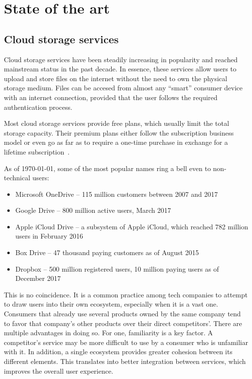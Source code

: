 \chapter{State of the art}\label{state_of_the_art}

\section{Cloud storage services} \label{cloud_storage_services}

Cloud storage services have been steadily increasing in popularity and reached mainstream status in the past decade. In essence, these services allow users to upload and store files on the internet without the need to own the physical storage medium. Files can be accesed from almost any ``smart'' consumer device with an internet connection, provided that the user follows the required authentication process.

Most cloud storage services provide free plans, which usually limit the total storage capacity. Their premium plans either follow the subscription business model or even go as far as to require a one-time purchase in exchange for a lifetime subscription~\cite{get_3tb_of_lifetime_cloud_storage}.

As of \monthyeardate\today, some of the most popular names ring a bell even to non-technical users:
\begin{itemize} \label{lst:cloud_storage_services}
\itemsep0em
\item Microsoft OneDrive -- 115 million customers between 2007 and 2017~\cite{10_years_of_onedrive}
\item Google Drive -- 800 million active users, March 2017~\cite{google_plans_to_leverage,google_updates_drive_focus_on_business}
\item Apple iCloud Drive -- a subsystem of Apple iCloud, which reached 782 million users in February 2016~\cite{icloud_hits_782m_users}
\item Box Drive -- 47 thousand paying customers as of August 2015~\cite{box_hires_nasdaq_exec}
\item Dropbox -- 500 million registered users, 10 million paying users as of December 2017~\cite{dropbox_inc_registration_statement}
\end{itemize}

This is no coincidence. It is a common practice among tech companies to attempt to draw users into their own ecosystem, especially when it is a vast one. Consumers that already use several products owned by the same company tend to favor that company's other products over their direct competitors'. There are multiple advantages in doing so. For one, familiarity is a key factor. A competitor's service may be more difficult to use by a consumer who is unfamiliar with it. In addition, a single ecosystem provides greater cohesion between its different elements. This translates into better integration between services, which improves the overall user experience.

